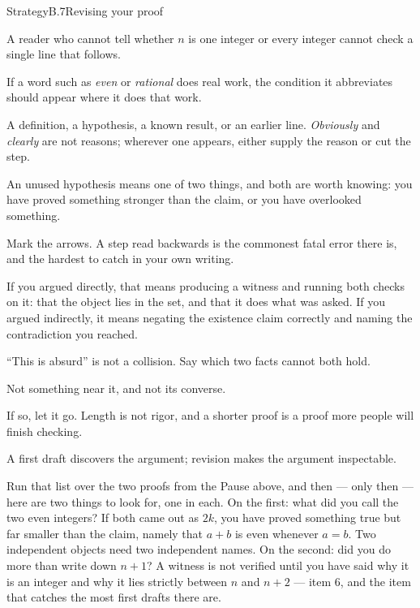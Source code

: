 \documentclass[a4paper,12pt,oneside]{memoir}
\begin{document}
\begin{envstrategy}{Strategy}{B.7}{Revising your proof}
\begin{steps}
  \item {} A reader who cannot tell whether \(n\) is one integer or every integer cannot check a single line that follows.
  \item {} If a word such as \emph{even} or \emph{rational} does real work, the condition it abbreviates should appear where it does that work.
  \item {} A definition, a hypothesis, a known result, or an earlier line. \emph{Obviously} and \emph{clearly} are not reasons; wherever one appears, either supply the reason or cut the step.
  \item {} An unused hypothesis means one of two things, and both are worth knowing: you have proved something stronger than the claim, or you have overlooked something.
  \item {} Mark the arrows. A step read backwards is the commonest fatal error there is, and the hardest to catch in your own writing.
  \item {} If you argued directly, that means producing a witness and running both checks on it: that the object lies in the set, and that it does what was asked. If you argued indirectly, it means negating the existence claim correctly and naming the contradiction you reached.
  \item {} “This is absurd” is not a collision. Say which two facts cannot both hold.
  \item {} Not something near it, and not its converse.
  \item {} If so, let it go. Length is not rigor, and a shorter proof is a proof more people will finish checking.
\end{steps}
\begin{informal}
A first draft discovers the argument; revision makes the argument inspectable.
\end{informal}
\end{envstrategy}
Run that list over the two proofs from the Pause above, and then — only then — here are two things to look for, one in each. On the first: what did you call the two even integers? If both came out as \(2k\), you have proved something true but far smaller than the claim, namely that \(a + b\) is even whenever \(a = b\). Two independent objects need two independent names. On the second: did you do more than write down \(n + 1\)? A witness is not verified until you have said why it is an integer and why it lies strictly between \(n\) and \(n + 2\) — item 6, and the item that catches the most first drafts there are.
\end{document}
